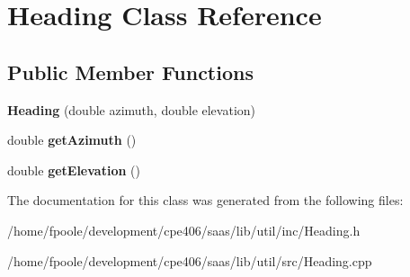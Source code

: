 \hypertarget{class_heading}{}\section{Heading Class Reference}
\label{class_heading}
\subsection*{Public Member Functions}
\begin{DoxyCompactItemize}
\item 
\hypertarget{class_heading_a596e28591ab0f411fdfa3fb827372297}{}{\bfseries Heading} (double azimuth, double elevation)\label{class_heading_a596e28591ab0f411fdfa3fb827372297}

\item 
\hypertarget{class_heading_a49146efc7c2558755527e7a630e9a59d}{}double {\bfseries get\+Azimuth} ()\label{class_heading_a49146efc7c2558755527e7a630e9a59d}

\item 
\hypertarget{class_heading_ad6b16471bec2fdf2af7b176c0ca131e7}{}double {\bfseries get\+Elevation} ()\label{class_heading_ad6b16471bec2fdf2af7b176c0ca131e7}

\end{DoxyCompactItemize}


The documentation for this class was generated from the following files\+:\begin{DoxyCompactItemize}
\item 
/home/fpoole/development/cpe406/saas/lib/util/inc/Heading.\+h\item 
/home/fpoole/development/cpe406/saas/lib/util/src/Heading.\+cpp\end{DoxyCompactItemize}
